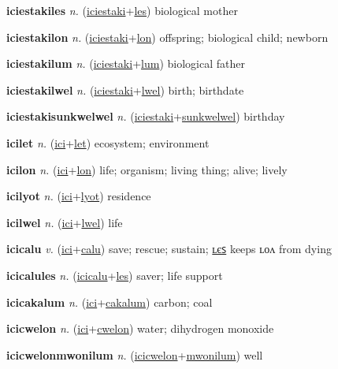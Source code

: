 \textbf{\hypertarget{iciestakiles}{iciestakiles}} \textit{n.} (\hyperlink{iciestaki}{iciestaki}+\allowbreak \hyperlink{les}{les})
biological mother

\textbf{\hypertarget{iciestakilon}{iciestakilon}} \textit{n.} (\hyperlink{iciestaki}{iciestaki}+\allowbreak \hyperlink{lon}{lon})
offspring; biological child; newborn

\textbf{\hypertarget{iciestakilum}{iciestakilum}} \textit{n.} (\hyperlink{iciestaki}{iciestaki}+\allowbreak \hyperlink{lum}{lum})
biological father

\textbf{\hypertarget{iciestakilwel}{iciestakilwel}} \textit{n.} (\hyperlink{iciestaki}{iciestaki}+\allowbreak \hyperlink{lwel}{lwel})
birth; birthdate

\textbf{\hypertarget{iciestakisunkwelwel}{iciestakisunkwelwel}} \textit{n.} (\hyperlink{iciestaki}{iciestaki}+\allowbreak \hyperlink{sunkwelwel}{sunkwelwel})
birthday

\textbf{\hypertarget{icilet}{icilet}} \textit{n.} (\hyperlink{ici}{ici}+\allowbreak \hyperlink{let}{let})
ecosystem; environment

\textbf{\hypertarget{icilon}{icilon}} \textit{n.} (\hyperlink{ici}{ici}+\allowbreak \hyperlink{lon}{lon})
life; organism; living thing; alive; lively

\textbf{\hypertarget{icilyot}{icilyot}} \textit{n.} (\hyperlink{ici}{ici}+\allowbreak \hyperlink{lyot}{lyot})
residence

\textbf{\hypertarget{icilwel}{icilwel}} \textit{n.} (\hyperlink{ici}{ici}+\allowbreak \hyperlink{lwel}{lwel})
life

\textbf{\hypertarget{icicalu}{icicalu}} \textit{v.} (\hyperlink{ici}{ici}+\allowbreak \hyperlink{calu}{calu})
save; rescue; sustain; \hyperlink{icicalules}{ʟєꜱ} keeps ʟᴏᴧ from dying

\textbf{\hypertarget{icicalules}{icicalules}} \textit{n.} (\hyperlink{icicalu}{icicalu}+\allowbreak \hyperlink{les}{les})
saver; life support

\textbf{\hypertarget{icicakalum}{icicakalum}} \textit{n.} (\hyperlink{ici}{ici}+\allowbreak \hyperlink{cakalum}{cakalum})
carbon; coal

\textbf{\hypertarget{icicwelon}{icicwelon}} \textit{n.} (\hyperlink{ici}{ici}+\allowbreak \hyperlink{cwelon}{cwelon})
water; dihydrogen monoxide

\textbf{\hypertarget{icicwelonmwonilum}{icicwelonmwonilum}} \textit{n.} (\hyperlink{icicwelon}{icicwelon}+\allowbreak \hyperlink{mwonilum}{mwonilum})
well

